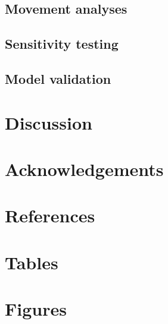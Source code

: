 \documentclass{article}
\begin{document}
\subsection{Movement analyses}

\subsection{Sensitivity testing}

\subsection{Model validation}


\section{Discussion}


\section{Acknowledgements}

\section{References}


\section{Tables}


\section{Figures}


\vspace{20mm}
\end{document}
